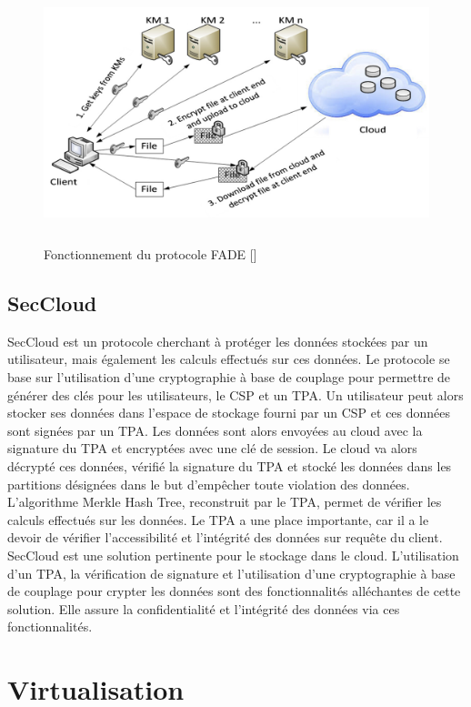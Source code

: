 \begin{figure}[hb]
	\center
	\includegraphics[height=7.5cm]{./pics/schema_fade.png}
	\caption{Fonctionnement du protocole FADE [\cite{security_cloud_survey}]}
	\label{label-image1}
\end{figure}

\subsection{SecCloud}
SecCloud est un protocole cherchant à protéger les données stockées par un utilisateur, mais également les calculs effectués sur ces données. Le protocole se base sur l'utilisation d'une cryptographie à base de couplage pour permettre de générer des clés pour les utilisateurs, le CSP et un TPA. Un utilisateur peut alors stocker ses données dans l'espace de stockage fourni par un CSP et ces données sont signées par un TPA. Les données sont alors envoyées au cloud avec la signature du TPA et encryptées avec une clé de session. Le cloud va alors décrypté ces données, vérifié la signature du TPA et stocké les données dans les partitions désignées dans le but d'empêcher toute violation des données. 
L'algorithme Merkle Hash Tree, reconstruit par le TPA, permet de vérifier les calculs effectués sur les données. Le TPA a une place importante, car il a le devoir de vérifier l’accessibilité et l’intégrité des données sur requête du client.
\newline
SecCloud est une solution pertinente pour le stockage dans le cloud. L'utilisation d'un TPA, la vérification de signature et l'utilisation d'une cryptographie à base de couplage pour crypter les données sont des fonctionnalités alléchantes de cette solution. Elle assure la confidentialité et l'intégrité des données via ces fonctionnalités.

\section{Virtualisation}\label{sec:vir}

